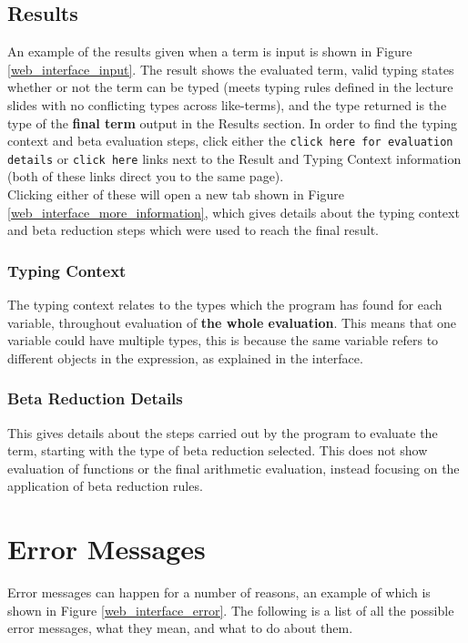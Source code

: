 \documentclass[a4paper,11pt]{article}
\begin{document}
\subsection{Results}

An example of the results given when a term is input is shown in Figure \ref{web_interface_input}. The result shows the evaluated term, valid typing states whether or not the term can be typed (meets typing rules defined in the lecture slides with no conflicting types across like-terms), and the type returned is the type of the \textbf{final term} output in the Results section. In order to find the typing context and beta evaluation steps, click either the \texttt{click here for evaluation details} or \texttt{click here} links next to the Result and Typing Context information (both of these links direct you to the same page).\\

Clicking either of these will open a new tab shown in Figure \ref{web_interface_more_information}, which gives details about the typing context and beta reduction steps which were used to reach the final result.

\subsubsection{Typing Context}

The typing context relates to the types which the program has found for each variable, throughout evaluation of \textbf{the whole evaluation}. This means that one variable could have multiple types, this is because the same variable refers to different objects in the expression, as explained in the interface.

\subsubsection{Beta Reduction Details}

This gives details about the steps carried out by the program to evaluate the term, starting with the type of beta reduction selected. This does not show evaluation of functions or the final arithmetic evaluation, instead focusing on the application of beta reduction rules.

\section{Error Messages}

Error messages can happen for a number of reasons, an example of which is shown in Figure \ref{web_interface_error}. The following is a list of all the possible error messages, what they mean, and what to do about them.
\end{document}

